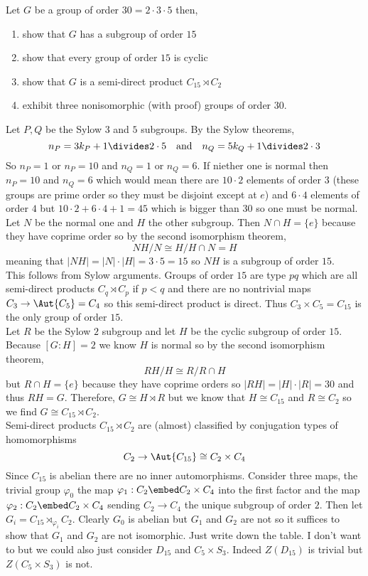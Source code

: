 \documentclass[12pt]{article}
\begin{document}
\begin{exercise}
Let $G$ be a group of order $30 = 2 \cdot 3 \cdot 5$ then,
\begin{enumerate}
\item show that $G$ has a subgroup of order $15$
\item show that every group of order $15$ is cyclic
\item show that $G$ is a semi-direct product $C_{15} \rtimes C_2$
\item exhibit three nonisomorphic (with proof) groups of order $30$.
\end{enumerate}
\end{exercise} 

Let $P, Q$ be the Sylow $3$ and $5$ subgroups. By the Sylow theorems,
\[ n_P = 3 k_P + 1 \divides 2 \cdot 5 \quad \text{and} \quad n_Q = 5 k_Q + 1 \divides 2 \cdot 3 \]
So $n_P = 1$ or $n_P = 10$ and $n_Q = 1$ or $n_Q = 6$. If niether one is normal then $n_P = 10$ and $n_Q = 6$ which would mean there are $10 \cdot 2$ elements of order $3$ (these groups are prime order so they must be disjoint except at $e$) and $6 \cdot 4$ elements of order $4$ but $10 \cdot 2 + 6 \cdot 4 + 1 = 45$ which is bigger than $30$ so one must be normal. Let $N$ be the normal one and $H$ the other subgroup. Then $N \cap H = \{ e \}$ because they have coprime order so by the second isomorphism theorem,
\[ NH / N \cong H / H \cap N = H \]
meaning that $|NH| = |N| \cdot |H| = 3 \cdot 5 = 15$ so $NH$ is a subgroup of order $15$.
\bigskip\\
This follows from Sylow arguments. Groups of order $15$ are type $pq$ which are all semi-direct products $C_q \rtimes C_p$ if $p < q$ and there are no nontrivial maps $C_3 \to \Aut{C_5} = C_4$ so this semi-direct product is direct. Thus $C_3 \times C_5 = C_{15}$ is the only group of order $15$.
\bigskip\\
Let $R$ be the Sylow $2$ subgroup and let $H$ be the cyclic subgroup of order $15$. Because $[G : H] = 2$ we know $H$ is normal so by the second isomorphism theorem,
\[ R H / H \cong R / R \cap H \]
but $R \cap H = \{ e \}$ because they have coprime orders so $|RH| = |H| \cdot |R| = 30$ and thus $RH = G$. Therefore, $G \cong H \rtimes R$ but we know that $H \cong C_{15}$ and $R \cong C_2$ so we find $G \cong C_{15} \rtimes C_2$.
\bigskip\\
Semi-direct products $C_{15} \rtimes C_2$ are (almost) classified by conjugation types of homomorphisms
\[ C_2 \to \Aut{C_{15}} \cong C_{2} \times C_4 \]
Since $C_{15}$ is abelian there are no inner automorphisms. Consider three maps, the trivial group $\varphi_0$ the map $\varphi_1 : C_2 \embed C_2 \times C_4$ into the first factor and the map $\varphi_2 : C_2 \embed C_2 \times C_4$ sending $C_2 \to C_4$ the unique subgroup of order $2$. Then let $G_i = C_{15} \rtimes_{\varphi_i} C_2$. Clearly $G_0$ is abelian but $G_1$ and $G_2$ are not so it suffices to show that $G_1$ and $G_2$ are not isomorphic. Just write down the table. I don't want to but we could also just consider $D_{15}$ and $C_5 \times S_3$. Indeed $Z(D_{15})$ is trivial but $Z(C_5 \times S_3)$ is not. 
\end{document}
